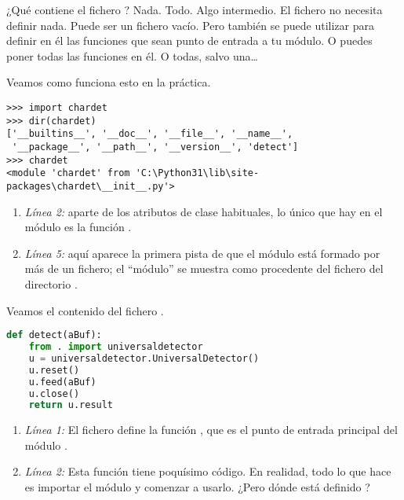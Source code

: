 ¿Qué contiene el fichero ? Nada. Todo. Algo intermedio. El fichero  no necesita definir nada. Puede ser un fichero vacío. Pero también se puede utilizar para definir en él las funciones que sean punto de entrada a tu módulo. O puedes poner todas las funciones en él. O todas, salvo una\ldots


Veamos como funciona esto en la práctica.

\begin{lstlisting}[breaklines=true]
>>> import chardet
>>> dir(chardet)
['__builtins__', '__doc__', '__file__', '__name__',
 '__package__', '__path__', '__version__', 'detect']
>>> chardet
<module 'chardet' from 'C:\Python31\lib\site-packages\chardet\__init__.py'>
\end{lstlisting}

\begin{enumerate}
  \item \emph{Línea 2:} aparte de los atributos de clase habituales, lo único que hay en el módulo  es la función .
  \item \emph{Línea 5:} aquí aparece la primera pista de que el módulo  está formado por más de un fichero; el ``módulo'' se muestra como procedente del fichero  del directorio .
\end{enumerate}

Veamos el contenido del fichero .


\begin{lstlisting}[language=Python,breaklines=true]
def detect(aBuf):                              
    from . import universaldetector            
    u = universaldetector.UniversalDetector()
    u.reset()
    u.feed(aBuf)
    u.close()
    return u.result
\end{lstlisting}

\begin{enumerate}
  \item \emph{Línea 1:} El fichero define la función , que es el punto de entrada principal del módulo .
  \item \emph{Línea 2:} Esta función tiene poquísimo código. En realidad, todo lo que hace es importar el módulo  y comenzar a usarlo. ¿Pero dónde está definido ?
\end{enumerate}


